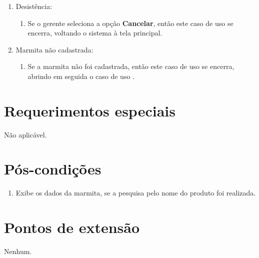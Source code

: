 \begin{enumerate}
	\item Desistência:
	\begin{enumerate}
		\item Se o gerente seleciona a opção \textbf{Cancelar}, então este caso de uso se encerra, voltando o sistema à tela principal.
	\end{enumerate}
	\item Marmita não cadastrada:
	\begin{enumerate}
		\item Se a marmita não foi cadastrada, então este caso de uso se encerra, abrindo em seguida o caso de uso .
	\end{enumerate}
\end{enumerate}

\section{Requerimentos especiais}

Não aplicável.

\section{Pós-condições}

\begin{enumerate}
	\item Exibe os dados da marmita, se a pesquisa pelo nome do produto foi realizada.
\end{enumerate}

\section{Pontos de extensão}

Nenhum.